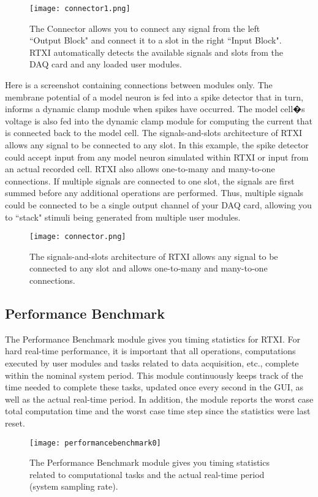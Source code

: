 \begin{figure}[h]
\begin{center}
\texttt{[image: connector1.png]} 
\caption[Connector]{The Connector allows you to connect any signal from the left ``Output Block" and connect it to a slot in the right ``Input Block". RTXI automatically detects the available signals and slots from the DAQ card and any loaded user modules.} 
\end{center}
\label{fig:connector1}
\end{figure}

Here is a screenshot containing connections between modules only. The membrane potential of a model neuron is fed into a spike detector that in turn, informs a dynamic clamp module when spikes have occurred. The model cell�s voltage is also fed into the dynamic clamp module for computing the current that is connected back to the model cell. \attention The signals-and-slots architecture of RTXI allows any signal to be connected to any slot. In this example, the spike detector could accept input from any model neuron simulated within RTXI or input from an actual recorded cell. RTXI also allows one-to-many and many-to-one connections. If multiple signals are connected to one slot, the signals are first summed before any additional operations are performed. Thus, multiple signals could be connected to be a single output channel of your DAQ card, allowing you to ``stack" stimuli being generated from multiple user modules.

\begin{figure}[h]
\begin{center}
\texttt{[image: connector.png]} 
\caption[Connector]{The signals-and-slots architecture of RTXI allows any signal to be connected to any slot and allows one-to-many and many-to-one connections.} 
\end{center}
\label{fig:connector}
\end{figure}

\subsection{Performance Benchmark}

The Performance Benchmark module gives you timing statistics for RTXI. For hard real-time performance, it is important that all operations, computations executed by user modules and tasks related to data acquisition, etc., complete within the nominal system period. This module continuously keeps track of the time needed to complete these tasks, updated once every second in the GUI, as well as the actual real-time period. In addition, the module reports the worst case total computation time and the worst case time step since the statistics were last reset.

\begin{figure}[h]
\begin{center}
\texttt{[image: performancebenchmark0]} 
\caption[Performance Benchmark]{The Performance Benchmark module gives you timing statistics related to computational tasks and the actual real-time period (system sampling rate).} 
\end{center}
\label{fig:performancebenchmark0}
\end{figure}